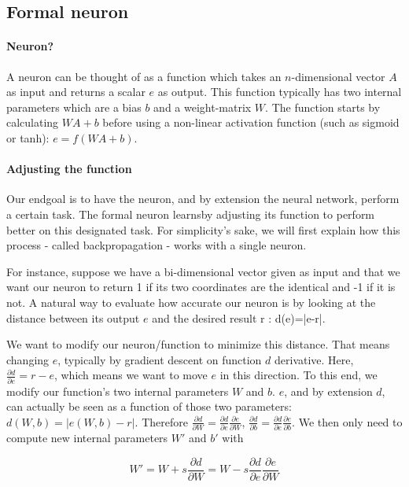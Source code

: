 \documentclass[conference]{IEEEtran}
\begin{document}
\subsection{Formal neuron}

\paragraph{Neuron?}
A neuron can be thought of as a function which takes an $n$-dimensional vector
$A$ as input and returns a scalar $e$ as output. This function typically has two
internal parameters which are a bias $b$ and a weight-matrix $W$. The function
starts by calculating $WA+b$ before using a non-linear activation function (such as sigmoid or tanh): $e=f(WA+b)$.

\paragraph{Adjusting the function}

Our endgoal is to have the neuron, and by extension the neural network, perform
a certain task. The formal neuron \og learns\fg by adjusting its function to perform better on
this designated task. For simplicity's sake, we will first explain how this
process - called \og backpropagation\fg{} - works with a single neuron.

For instance, suppose we have a bi-dimensional vector given as input and that we
want our neuron to return 1 if its two coordinates are the identical and -1 if
it is not. A natural way to evaluate how accurate our neuron is by looking at the
distance between its output $e$ and the desired result r : d(e)=|e-r|.

We want to modify our neuron/function to minimize this distance. That means
changing $e$, typically by gradient descent on function $d$ derivative. Here,
$\frac{\partial d}{\partial e} = r-e$, which means we want to \og move\fg{} $e$ in this
direction. To this end, we modify our function's two internal parameters $W$ and
$b$. $e$, and by extension $d$, can actually be seen as a function of those two
parameters: $d(W,b)=|e(W,b)-r|$. Therefore $\frac{\partial d}{\partial W}
   = \frac{\partial d}{\partial e}\frac{\partial e}{\partial W}$,
$\frac{\partial d}{\partial b}
   = \frac{\partial d}{\partial e}\frac{\partial e}{\partial b}$. We then only
   need to compute new internal parameters $W'$ and $b'$ with 

\begin{equation}
     W'=W + s\frac{\partial d}{\partial W}=W-s\frac{\partial d}{\partial e}\frac{\partial e}{\partial W}
\end{equation}
\end{document}
